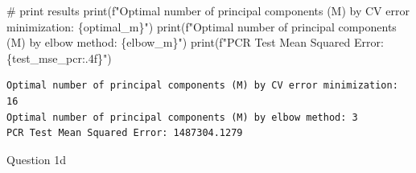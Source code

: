 \documentclass[
  letterpaper,
  DIV=11,
  numbers=noendperiod]{scrartcl}
\newenvironment{Shaded}{\begin{snugshade}}{\end{snugshade}}
\newcommand{\BuiltInTok}[1]{\textcolor[rgb]{0.00,0.23,0.31}{#1}}
\newcommand{\CommentTok}[1]{\textcolor[rgb]{0.37,0.37,0.37}{#1}}
\newcommand{\NormalTok}[1]{\textcolor[rgb]{0.00,0.23,0.31}{#1}}
\newcommand{\SpecialCharTok}[1]{\textcolor[rgb]{0.37,0.37,0.37}{#1}}
\newcommand{\SpecialStringTok}[1]{\textcolor[rgb]{0.13,0.47,0.30}{#1}}
\begin{document}
\begin{Shaded}
\begin{Highlighting}[]
\CommentTok{\# print results}
\BuiltInTok{print}\NormalTok{(}\SpecialStringTok{f"Optimal number of principal components (M) by CV error minimization: }\SpecialCharTok{\{}\NormalTok{optimal\_m}\SpecialCharTok{\}}\SpecialStringTok{"}\NormalTok{)}
\BuiltInTok{print}\NormalTok{(}\SpecialStringTok{f"Optimal number of principal components (M) by elbow method: }\SpecialCharTok{\{}\NormalTok{elbow\_m}\SpecialCharTok{\}}\SpecialStringTok{"}\NormalTok{)}
\BuiltInTok{print}\NormalTok{(}\SpecialStringTok{f"PCR Test Mean Squared Error: }\SpecialCharTok{\{}\NormalTok{test\_mse\_pcr}\SpecialCharTok{:.4f\}}\SpecialStringTok{"}\NormalTok{)}
\end{Highlighting}
\end{Shaded}

\begin{verbatim}
Optimal number of principal components (M) by CV error minimization: 16
Optimal number of principal components (M) by elbow method: 3
PCR Test Mean Squared Error: 1487304.1279
\end{verbatim}

Question 1d
\end{document}
